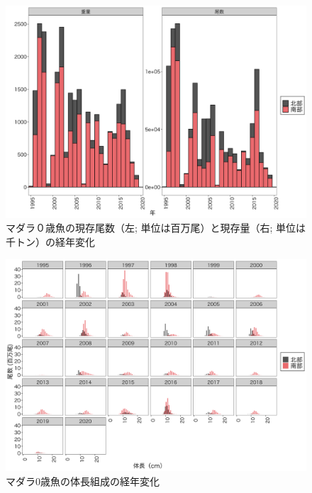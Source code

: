 \documentclass[11pt]{article} %
\begin{document}
\begin{linenumbers}
\begin{figure}[h]
  \centering
  \includegraphics[width = 14cm]{マダラ０＋trend.png}
  \caption{マダラ０歳魚の現存尾数（左; 単位は百万尾）と現存量（右; 単位は千トン）の経年変化}
\end{figure}

\begin{figure}[h]
  \centering
  \includegraphics[width = 14cm]{マダラ0+length.png}
  \caption{マダラ0歳魚の体長組成の経年変化}
\end{figure}


\end{linenumbers}
\end{document}
